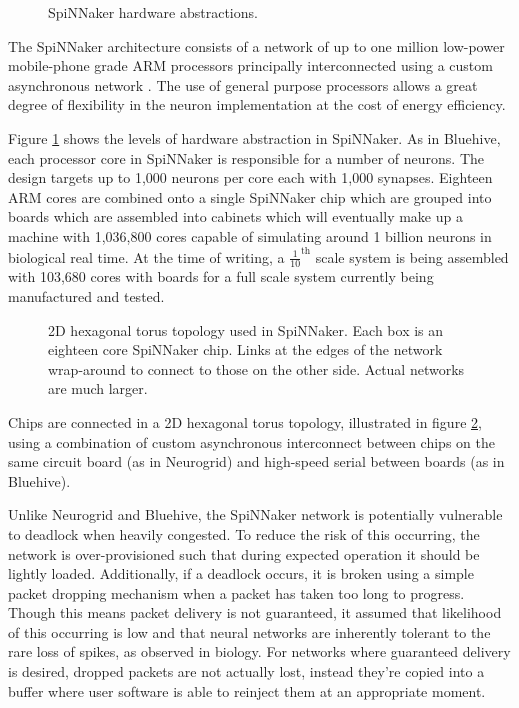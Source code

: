 				\begin{figure}
					
					
					\caption{SpiNNaker hardware abstractions.}
					\label{fig:spinnaker-abstractions}
				\end{figure}
				
				The SpiNNaker architecture consists of a network of up to one million
				low-power mobile-phone grade ARM processors principally interconnected
				using a custom asynchronous network \cite{furber06}. The use of general
				purpose processors allows a great degree of flexibility in the neuron
				implementation at the cost of energy efficiency. 
				
				Figure \ref{fig:spinnaker-abstractions} shows the levels of hardware
				abstraction in SpiNNaker. As in Bluehive, each processor core in
				SpiNNaker is responsible for a number of neurons. The design targets up
				to 1,000 neurons per core each with 1,000 synapses. Eighteen ARM cores
				are combined onto a single SpiNNaker chip which are grouped into boards
				which are assembled into cabinets which will eventually make up a
				machine with 1,036,800 cores capable of simulating around 1 billion
				neurons in biological real time.  At the time of writing, a
				$\frac{1}{10}^{\textrm{th}}$ scale system is being assembled with
				103,680 cores with boards for a full scale system currently being
				manufactured and tested.
				
				\begin{figure}
					\center
					
					
					\caption[2D hexagonal torus topology used in SpiNNaker.]{2D hexagonal
					torus topology used in SpiNNaker. Each box is an eighteen core
					SpiNNaker chip. Links at the edges of the network wrap-around to
					connect to those on the other side. Actual networks are much larger.}
					\label{fig:spinn-topology}
				\end{figure}
				
				Chips are connected in a 2D hexagonal torus topology, illustrated in
				figure \ref{fig:spinn-topology}, using a combination of custom
				asynchronous interconnect between chips on the same circuit board (as in
				Neurogrid) and high-speed serial between boards (as in Bluehive).
				
				Unlike Neurogrid and Bluehive, the SpiNNaker network is potentially
				vulnerable to deadlock when heavily congested. To reduce the risk of
				this occurring, the network is over-provisioned such that during
				expected operation it should be lightly loaded. Additionally, if a
				deadlock occurs, it is broken using a simple packet dropping mechanism
				when a packet has taken too long to progress. Though this means packet
				delivery is not guaranteed, it assumed that likelihood of this occurring
				is low and that neural networks are inherently tolerant to the rare loss
				of spikes, as observed in biology. For networks where guaranteed
				delivery is desired, dropped packets are not actually lost, instead
				they're copied into a buffer where user software is able to reinject
				them at an appropriate moment.
	
